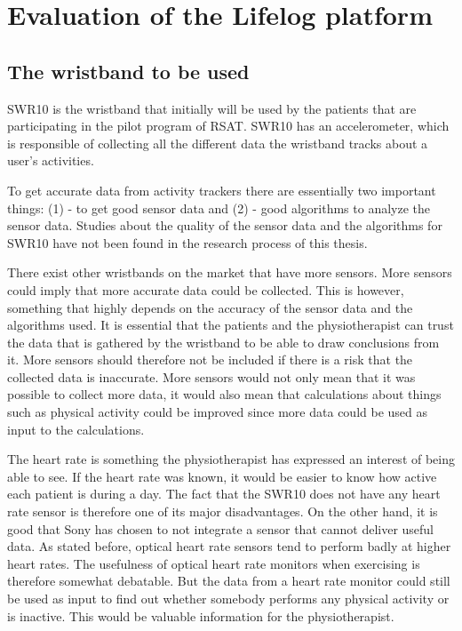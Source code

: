 \documentclass{cslthse-msc}
\begin{document}
\section{Evaluation of the Lifelog platform}
\label{sec:utLifelog}

\subsection{The wristband to be used}
SWR10 is the wristband that initially will be used by the patients that are participating in the pilot program of RSAT. SWR10 has an accelerometer, which is responsible of collecting all the different data the wristband tracks about a user’s activities.

To get accurate data from activity trackers there are essentially two important things: (1) - to get good sensor data and (2) - good algorithms to analyze the sensor data. Studies about the quality of the sensor data and the algorithms for SWR10 have not been found in the research process of this thesis.   

There exist other wristbands on the market that have more sensors. More sensors could imply that more accurate data could be collected. This is however, something that highly depends on the accuracy of the sensor data and the algorithms used. It is essential that the patients and the physiotherapist can trust the data that is gathered by the wristband to be able to draw conclusions from it. More sensors should therefore not be included if there is a risk that the collected data is inaccurate. More sensors would not only mean that it was possible to collect more data, it would also mean that calculations about things such as physical activity could be improved since more data could be used as input to the calculations. %


The heart rate is something the physiotherapist has expressed an interest of being able to see. If the heart rate was known, it would be easier to know how active each patient is during a day. The fact that the SWR10 does not have any heart rate sensor is therefore one of its major disadvantages. On the other hand, it is good that Sony has chosen to not integrate a sensor that cannot deliver useful data. As stated before, optical heart rate sensors tend to perform badly at higher heart rates. The usefulness of optical heart rate monitors when exercising is therefore somewhat debatable. But the data from a heart rate monitor could still be used as input to find out whether somebody performs any physical activity or is inactive. This would be valuable information for the physiotherapist.
\end{document}
